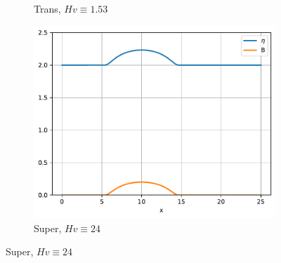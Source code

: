\documentclass[pt12]{beamer}
\begin{document}
\begin{frame}[label=NumericalResultsWithoutWBmonodimensionalcasesSW]
\begin{figure}
\begin{subfigure}[b]{0.30\textwidth}
         \caption{Trans, $Hv\equiv 1.53$}
         \label{convergence_comp_jumps_trans}
     \end{subfigure}
     \begin{subfigure}[b]{0.30\textwidth}
         \centering
         \includegraphics[width=\textwidth]{sup.pdf}
         \caption{Super, $Hv\equiv 24$}
         \label{convergence_comp_jumps_super}
     \end{subfigure}


\end{figure}
\end{frame}
\end{document}
